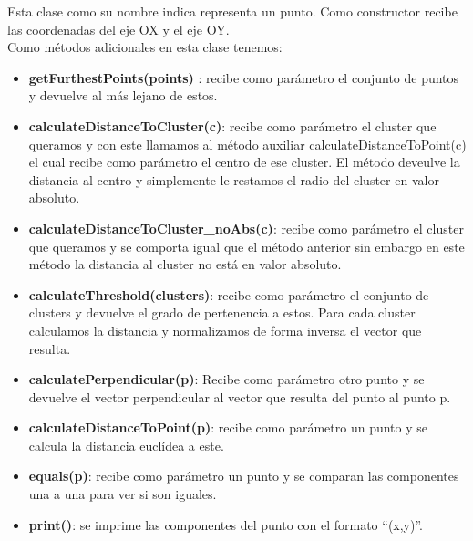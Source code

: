 \documentclass[conference,a4paper]{IEEEtran}
\begin{document}
Esta clase como su nombre indica representa un punto. Como constructor recibe las coordenadas del eje OX y el eje OY.\\

Como métodos adicionales en esta clase tenemos:\\

\begin{itemize}

	\item{\textbf{getFurthestPoints(points)	}: recibe como parámetro el conjunto de puntos y devuelve al más lejano de estos.}\\
	\item{\textbf{calculateDistanceToCluster(c)}: recibe como parámetro el cluster que queramos y con este llamamos al método auxiliar calculateDistanceToPoint(c) el cual recibe como parámetro el centro de ese cluster. El método deveulve la distancia al centro y simplemente le restamos el radio del cluster en valor absoluto.}\\
	\item{\textbf{calculateDistanceToCluster\_noAbs(c)}: recibe como parámetro el cluster que queramos y se comporta igual que el método anterior sin embargo en este método la distancia al cluster no está en valor absoluto.}\\
	\item{\textbf{calculateThreshold(clusters)}: recibe como parámetro el conjunto de clusters y devuelve el grado de pertenencia a estos. Para cada cluster calculamos la distancia y normalizamos de forma inversa el vector que resulta.}\\
	\item{\textbf{calculatePerpendicular(p)}: Recibe como parámetro otro punto y se devuelve el vector perpendicular al vector que resulta del punto al punto p.}\\
	\item{\textbf{calculateDistanceToPoint(p)}: recibe como parámetro un punto y se calcula la distancia euclídea a este.}\\
	\item{\textbf{equals(p)}: recibe como parámetro un punto y se comparan las componentes una a una para ver si son iguales.}\\
	\item{\textbf{print()}: se imprime las componentes del punto con el formato “(x,y)”.}\\

\end{itemize}
\end{document}
